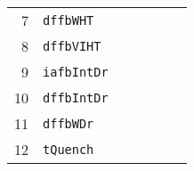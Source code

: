 \begin{table*}[htp]
\begin{tabular*}{\textwidth}{@{}rlrrrrr@{}}
\footnotesize{7}   & \footnotesize{\texttt{dffbWHT}}    &                        &                                 &&                         &    \\
\footnotesize{8}   & \footnotesize{\texttt{dffbVIHT}}   &                        &                                 &&                         &    \\
\footnotesize{9}   & \footnotesize{\texttt{iafbIntDr}}  &                        &                                 &&                         &    \\
\footnotesize{10}  & \footnotesize{\texttt{dffbIntDr}}  &                        &                                 &&                         &    \\
\footnotesize{11}  & \footnotesize{\texttt{dffbWDr}}    &                        &                                 &&                         &    \\
\footnotesize{12}  & \footnotesize{\texttt{tQuench}}    &                        &                                 &&                         &    \\
\bottomrule
\end{tabular*}
\end{table*}

